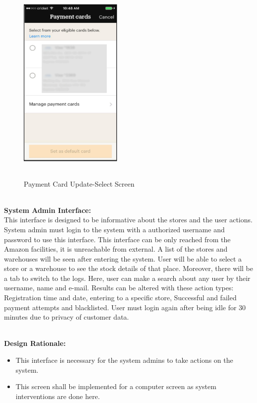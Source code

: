 \documentclass[11pt]{article}
\begin{document}
    \begin{center}
        \begin{figure}[H]
            \centering
            \includegraphics[width = 5cm, height = 10cm]{Images/PaymentCards.png}
            \caption{Payment Card Update-Select Screen}  
            \label{userlogininterface}
        \end{figure}
    \end{center}

    \textbf{\\System Admin Interface:\\}
    This interface is designed to be informative about
    the stores and the user actions. System admin must login to the system with a
    authorized username and password to use this interface. This interface can be only
    reached from the Amazon facilities, it is unreachable from external. A list of the
    stores and warehouses will be seen after entering the system. User will be able
    to select a store or a warehouse to see the stock details of that place. Moreover,
    there will be a tab to switch to the logs. Here, user can make a search about any
    user by their username, name and e-mail. Results can be altered with these action
    types: Registration time and date, entering to a specific store, Successful and failed
    payment attempts and blacklisted. User must login again after being idle for 30
    minutes due to privacy of customer data. 
    
    \textbf{\\Design Rationale:}
    \begin{itemize}
       \item This interface is necessary for the system admins to take actions on the system.
       \item This screen shall be implemented for a computer screen as system interventions are done here.
    \end{itemize}
    
\end{document}
